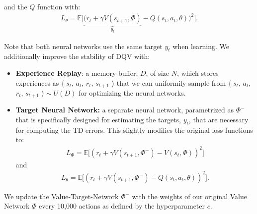 \documentclass[landscape,a0paper,fontscale=0.292]{baposter}
\begin{document}
\begin{poster}
{and the $Q$ function with:
\begin{align*}
L_{\theta} = \mathds{E} \big[\underbrace{(r_{t} + \gamma V(s_{t+1}, \Phi)}_{y_t} - Q(s_{t}, a_{t}, \theta))^{2}\big].
\label{eq: q_update_ann}
\end{align*}

Note that both neural networks use the same target $y_t$ when learning. We additionally improve the stability of DQV with:
\begin{itemize}
	\item \textbf{Experience Replay}: a memory buffer, $D$, of size $N$, which
    stores experiences as $\langle$ $s_{t}$, $a_{t}$, $r_{t}$, $s_{t+1}$
    $\rangle$ that we can uniformily sample from $\langle$ $s_{t}$, $a_{t}$, $r_{t}$, $s_{t+1}$ $\rangle \sim U(D)$ for optimizing the neural networks. 

	\item \textbf{Target Neural Network:} a separate neural network, parametrized as $\Phi^{-}$ that is specifically designed for estimating the targets, $y_{t}$, that are necessary for computing the TD 		errors. This slightly modifies the original loss functions to:
	\begin{align*}
		L_{\Phi} = \mathds{E} \big[(r_{t} + \gamma V(s_{t+1}, \Phi^{-}) - V(s_{t}, \Phi))^{2}\big]
	\end{align*}
	and 
	\begin{align*}
		L_{\theta} = \mathds{E} \big[(r_{t} + \gamma V(s_{t+1}, \Phi^{-}) - Q(s_{t}, a_{t}, \theta))^{2}\big].
	\end{align*}

\end{itemize}	 

We update the Value-Target-Network $\Phi^{-}$ with the weights of our original Value Network $\Phi$ every 10,000 actions as defined by the hyperparameter $c$.

}

\end{poster}%
%
\end{document}
